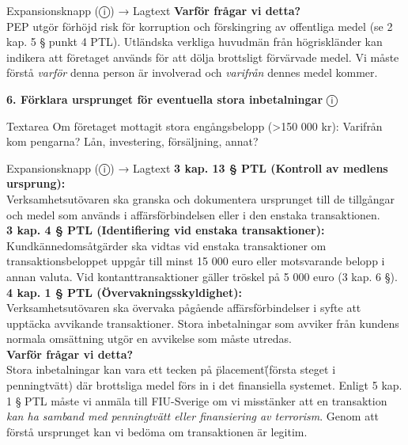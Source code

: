 \documentclass[10pt]{beamer}
\begin{document}
\begin{frame}[label=riskfragor-steg4-fortsattning]
\begin{alertblock}{Expansionsknapp (ⓘ) → Lagtext}
    \tiny \textbf{Varför frågar vi detta?}\\
    \tiny PEP utgör förhöjd risk för korruption och förskingring av offentliga medel (se 2 kap. 5 § punkt 4 PTL).
    Utländska verkliga huvudmän från högriskländer kan indikera att företaget används för att dölja brottsligt förvärvade medel.
    Vi måste förstå \emph{varför} denna person är involverad och \emph{varifrån} dennes medel kommer.
  \end{alertblock}

  \vspace{0.4cm}

  \textbf{6. Förklara ursprunget för eventuella stora inbetalningar} \hspace{0.3cm} ⓘ\\
  \begin{block}{Textarea}
    \tiny Om företaget mottagit stora engångsbelopp (>150 000 kr): Varifrån kom pengarna? 
    Lån, investering, försäljning, annat?
  \end{block}
  \begin{alertblock}{Expansionsknapp (ⓘ) → Lagtext}
    \tiny \textbf{3 kap. 13 § PTL (Kontroll av medlens ursprung):}\\
    \tiny Verksamhetsutövaren ska granska och dokumentera ursprunget till de tillgångar och medel som
    används i affärsförbindelsen eller i den enstaka transaktionen.\\[0.1cm]
    
    \tiny \textbf{3 kap. 4 § PTL (Identifiering vid enstaka transaktioner):}\\
    \tiny Kundkännedomsåtgärder ska vidtas vid enstaka transaktioner om transaktionsbeloppet uppgår till
    minst 15 000 euro eller motsvarande belopp i annan valuta. Vid kontanttransaktioner gäller tröskel på 5 000 euro (3 kap. 6 §).\\[0.1cm]
    
    \tiny \textbf{4 kap. 1 § PTL (Övervakningsskyldighet):}\\
    \tiny Verksamhetsutövaren ska övervaka pågående affärsförbindelser i syfte att upptäcka avvikande transaktioner.
    Stora inbetalningar som avviker från kundens normala omsättning utgör en avvikelse som måste utredas.\\[0.1cm]
    
    \tiny \textbf{Varför frågar vi detta?}\\
    \tiny Stora inbetalningar kan vara ett tecken på \"placement\" (första steget i penningtvätt) där brottsliga medel
    förs in i det finansiella systemet. Enligt 5 kap. 1 § PTL måste vi anmäla till FIU-Sverige om vi misstänker
    att en transaktion \emph{kan ha samband med penningtvätt eller finansiering av terrorism}.
    Genom att förstå ursprunget kan vi bedöma om transaktionen är legitim.
  \end{alertblock}


\end{frame}
\end{document}
